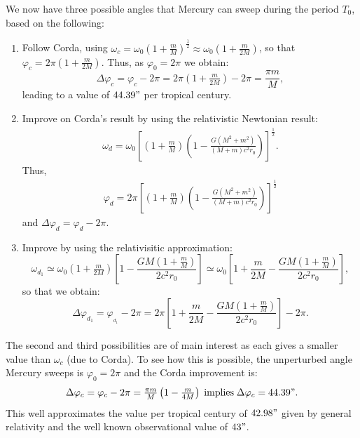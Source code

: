 \documentclass[11pt, reqno]{amsart}
\newcommand{\beqn}{\begin{eqnarray}}
\newcommand{\eeqn}{\end{eqnarray}}
\newcommand{\tf}{\tfrac}
\numberwithin{equation}{section}
\begin{document}
We now have three possible angles that Mercury can sweep during the period $T_0$, based on the following:
\begin{enumerate}
\item Follow Corda, using $\omega _c=\omega _0{\left(1 + \tfrac{m}{{M}} \right)^{\tf{1}{2}}} \approx \omega _0{\left(1 + \tfrac{m}{{2M}} \right)}$, so that ${\varphi _c} = 2\pi \left( {1 + \tfrac{m}{{2M}}} \right)$.  Thus, as ${\varphi _0}=2\pi$ we obtain:
\[
\Delta {\varphi _c} = {\varphi _c} - 2\pi  = 2\pi \left( {1 + \tfrac{m}{{2M}}} \right) - 2\pi  = \frac{{\pi m}}{M},
\]
leading to a value of $44.39"$ per tropical century.
\item Improve on Corda's result by using the relativistic Newtonian result:
\beqn
\omega _{d}={\omega _0}{\left[ {\left( {1 + \tfrac{m}{M}} \right)\left( {1 - \tfrac{{G\left( {{M^2} + {m^2}} \right)}}{{\left( {M + m} \right){c^2}r_0}}} \right)} \right]^{\tfrac{1}{2}}}.
\eeqn
Thus, 
\beqn
{\varphi _d} = 2\pi {\left[ {\left( {1 + \tfrac{m}{M}} \right)\left( {1 - \frac{{G\left( {{M^2} + {m^2}} \right)}}{{\left( {M + m} \right){c^2}{r_0}}}} \right)} \right]^{\tfrac{1}{2}}}
\eeqn
and $\Delta {\varphi _d} = {\varphi _d} - 2\pi$.
\item Improve by using the relativisitic approximation:
\[
{\omega _{{d_1}}} \simeq {\omega _0}\left( {1 + \tfrac{m}{{2M}}} \right)\left[ {1 - \frac{{GM\left( {1 + \tfrac{m}{M}} \right)}}{{2{c^2}{r_0}}}} \right] \simeq {\omega _0}\left[ {1 + \frac{m}{{2M}} - \frac{{GM\left( {1 + \tfrac{m}{M}} \right)}}{{2{c^2}{r_0}}}} \right],
\]
so that we obtain:
\[
 \Delta {\varphi _{{d_1}}} = {\varphi _{_{{d_1}}}} - 2\pi  = 2\pi \left[ {1 + \frac{m}{{2M}} - \frac{{GM\left( {1 + \tfrac{m}{M}} \right)}}{{2{c^2}{r_0}}}} \right] - 2\pi .
\]
\end{enumerate}
The second and third possibilities are of main interest as each gives a smaller value than  $\omega _c$ (due to Corda).  To see how this is possible, the unperturbed angle Mercury sweeps is ${\varphi _0}=2\pi$ and the Corda improvement is:
\beqn
\Delta {\varphi _c} = {\varphi _c} - 2\pi  = \tfrac{{\pi m}}{M}\left( {1 - \tfrac{{m}}{{4M}}} \right) \; {\rm{implies}}\; \Delta {\varphi _c} = 44.39".
\eeqn
This well approximates the value per tropical century of $42.98"$  given by general relativity and the well known observational value of $43"$. 
\end{document}
